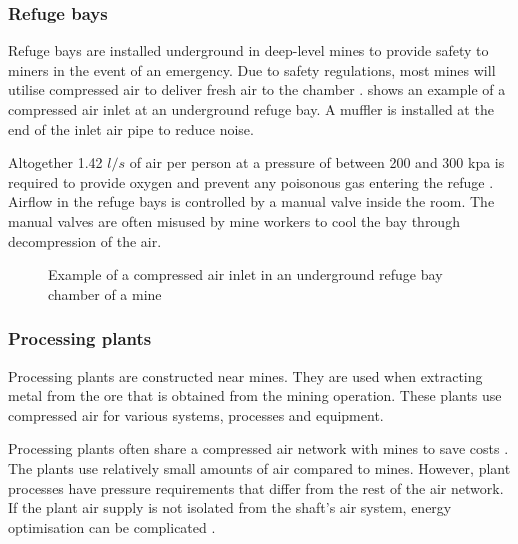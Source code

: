 \subsubsection{Refuge bays}
Refuge bays are installed underground in deep-level mines to provide safety to miners in the event of an emergency. Due to safety regulations, most mines will utilise compressed air to deliver fresh air to the chamber \cite{brake1999criteria}.  shows an example of a compressed air inlet at an underground refuge bay. A muffler is installed at the end of the inlet air pipe to reduce noise.
\par 
Altogether 1.42 $l/s$ of air per person at a pressure of between 200 and 300 \gls{kpa} is required to provide oxygen and prevent any poisonous gas entering the refuge \cite{brake1999criteria}. Airflow in the refuge bays is controlled by a manual valve inside the room. The manual valves are often misused by mine workers to cool the bay through decompression of the air. %
\begin{figure}[!htbp]
	\centering
	\caption{Example of a compressed air inlet in an underground refuge bay chamber of a mine}
	\label{fig: Refuge Bay}
\end{figure}
\subsubsection{Processing plants}
Processing plants are constructed near mines. They are used when extracting metal from the ore that is obtained from the mining operation.  These plants use compressed air for various systems, processes and equipment. 
\par 
Processing plants often share a compressed air network with mines to save costs \cite{Marais2012PhD}. The plants use relatively small amounts of air compared to mines. However, plant processes have pressure requirements that differ from the rest of the air network. If the plant air supply is not isolated from the shaft's air system, energy optimisation can be complicated \cite{Kriel2014Masters}. 
